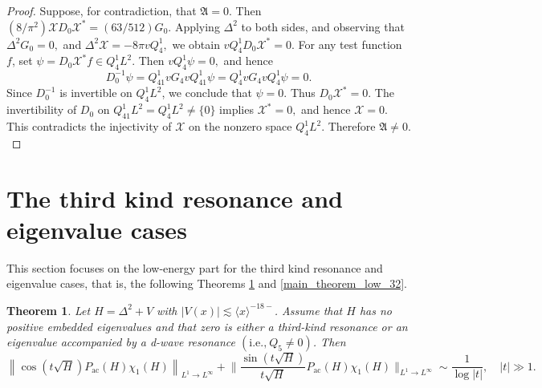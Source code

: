 \documentclass[reqno]{amsart}
\newtheorem{theorem}{Theorem}[section]
\numberwithin{equation}{section}
\begin{document}
\begin{proof}
	Suppose, for contradiction, that
	$
	\mathfrak{A}=0.
	$
	Then $
		({8}/{\pi^2})
		\mathcal{X}D_0\mathcal{X}^*=({63}/{512})G_0.$
	Applying $\Delta^2$ to both sides, and observing that
	$
	\Delta^2G_0=0,
$ and $
	\Delta^2\mathcal{X}
	=
	-8\pi vQ_4^1,
	$
	we obtain
	$
	vQ_4^1D_0\mathcal{X}^*=0.
	$
	For any test function $f$, set
	$
	\psi
	=
	D_0\mathcal{X}^*f
	\in Q_4^1L^2.
	$
	Then
	$
	vQ_{4}^1\psi=0,
	$
	and hence
	$$
	D_0^{-1}\psi
	=
	Q_{41}^1vG_4vQ_{41}^1\psi=	Q_{4}^1vG_4vQ_{4}^1\psi
	=
	0.
	$$
	Since $D_0^{-1}$ is invertible on $Q_4^1L^2$, we conclude that
	$
	\psi=0.
	$
	Thus
	$
	D_0\mathcal{X}^*=0.
	$
	The invertibility of $D_0$ on $Q_{41}^1L^2=Q_{4}^1L^2\neq\{0\}$ implies
	$
	\mathcal{X}^*=0,
	$
	and hence
	$
	\mathcal{X}=0.
	$
	This contradicts the injectivity of $\mathcal{X}$ on the nonzero
	space $Q_4^1L^2$. Therefore
	$
	\mathfrak{A}\neq0.
	$
\end{proof}
\section{The third kind resonance and eigenvalue cases}\label{sec:third_fourth}
This section focuses on the low-energy part for the  third kind resonance and eigenvalue cases, that is, the following Theorems \ref{main_theorem_low_31} and \ref{main_theorem_low_32}.

\begin{theorem}\label{main_theorem_low_31}
Let $H = \Delta^2 + V$ with $|V(x)| \lesssim \langle x \rangle^{-18-}$.
Assume that $H$ has no positive embedded eigenvalues and that zero is either a third-kind resonance or an eigenvalue accompanied by a d-wave resonance $(\text{i.e.,}\  Q_5 \neq 0 )$. Then
    \begin{equation}\label{optimality_31}
        \left\|\cos (t \sqrt{H}) P_{\mathrm{ac}}(H)\chi_1(H)\right\|_{L^1\to L^{\infty}} +
        \bigg\|\frac{\sin (t \sqrt{H})}{t\sqrt{H}} P_{\mathrm{ac}}(H)\chi_1(H)\bigg\|_{L^1 \to L^{\infty}} \sim \frac{1}{\log |t|}, \quad |t| \gg 1.
    \end{equation}
\end{theorem}
\end{document}
